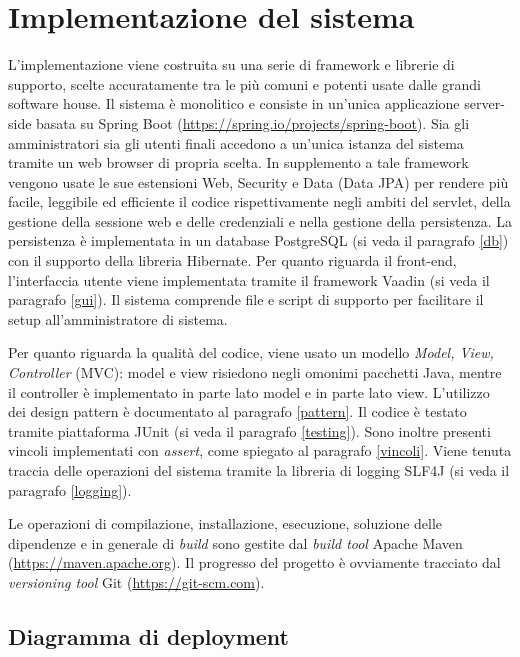 \chapter{Implementazione del sistema}\label{implementazione}
L'implementazione viene costruita su una serie di framework e librerie di supporto, scelte accuratamente tra le più comuni e potenti usate dalle grandi software house. Il sistema è monolitico e consiste in un'unica applicazione server-side basata su Spring Boot (\url{https://spring.io/projects/spring-boot}). Sia gli amministratori sia gli utenti finali accedono a un'unica istanza del sistema tramite un web browser di propria scelta. In supplemento a tale framework vengono usate le sue estensioni Web, Security e Data (Data JPA) per rendere più facile, leggibile ed efficiente il codice rispettivamente negli ambiti del servlet, della gestione della sessione web e delle credenziali e nella gestione della persistenza. La persistenza è implementata in un database PostgreSQL (si veda il paragrafo \ref{db}) con il supporto della libreria Hibernate. Per quanto riguarda il front-end, l'interfaccia utente viene implementata tramite il framework Vaadin (si veda il paragrafo \ref{gui}). Il sistema comprende file e script di supporto per facilitare il setup all'amministratore di sistema.

Per quanto riguarda la qualità del codice, viene usato un modello \emph{Model, View, Controller} (MVC): model e view risiedono negli omonimi pacchetti Java, mentre il controller è implementato in parte lato model e in parte lato view. L'utilizzo dei design pattern è documentato al paragrafo \ref{pattern}. Il codice è testato tramite piattaforma JUnit (si veda il paragrafo \ref{testing}). Sono inoltre presenti vincoli implementati con \emph{assert}, come spiegato al paragrafo \ref{vincoli}. Viene tenuta traccia delle operazioni del sistema tramite la libreria di logging SLF4J (si veda il paragrafo \ref{logging}).

Le operazioni di compilazione, installazione, esecuzione, soluzione delle dipendenze e in generale di \emph{build} sono gestite dal \emph{build tool} Apache Maven (\url{https://maven.apache.org}). Il progresso del progetto è ovviamente tracciato dal \emph{versioning tool} Git (\url{https://git-scm.com}).




\section{Diagramma di deployment}




